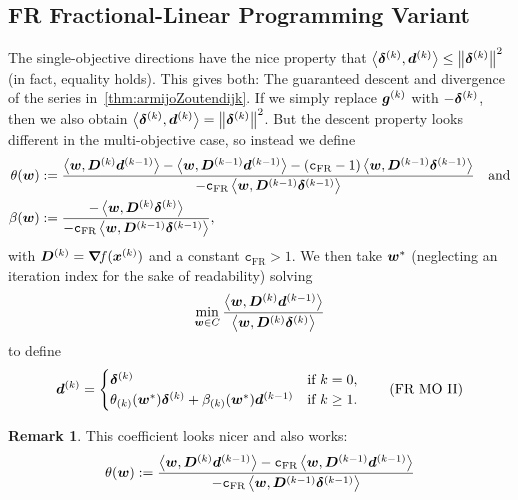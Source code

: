 \documentclass{article}
\theoremstyle{plain}
\theoremstyle{definition}
\newtheorem*{remark*}{Remark}
\begin{document}
\subsection{FR Fractional-Linear Programming Variant}
\newcommand*{\constFR}{\mathtt{c}_{\text{FR}}}
The single-objective directions have the nice property that 
$\left\langle \bm{\delta}^{(k)}, \bm{d}^{(k)} \right\rangle \leq \left\|\bm{\delta}^{(k)}\right\|^2$ (in fact, equality holds).
This gives both: The guaranteed descent and divergence of the series 
in~\cref{thm:armijoZoutendijk}.
If we simply replace $\bm{g}^{(k)}$ with $-\bm{\delta}^{(k)}$, then we also obtain 
$\left\langle \bm{\delta}^{(k)}, \bm{d}^{(k)} \right\rangle = \left\|\bm{\delta}^{(k)}\right\|^2$.
But the descent property looks different in the multi-objective case, 
so instead we define
\begin{align*}
\theta(\ve w)
&:= 
\frac{
	\mul{\ve w}{\ve D\KK \vdKp}
	-
	\mul{\ve w}{\ve D\KKp \vdKp}
	-(\constFR - 1)
	\mul{\ve w}{\ve D\KKp \sdKp}
}{
	-\constFR
	\mul{\ve w}{\ve D\KKp \sdKp}
}
&\text{and}
\\
\beta(\ve w)
&:=
\frac{
	-\mul{\ve w}{\ve D\KK \sdK}
}{
	-\constFR 
	\mul{\ve w}{\ve D\KKp \sdKp}
},
\end{align*}
with $\bm{D}^{(k)} = \bm{\nabla}\!f(\bm{x}^{(k)})$ and a constant $\constFR > 1$.
We then take $\bm{w}^*$
(neglecting an iteration index for the sake of readability) solving
\begin{equation}
\min_{\bm{w}\in C}
\frac{
	\left\langle \bm{w}, \bm{D}^{(k)} \bm{d}^{(k-1)} \right\rangle
}{
	\left\langle \bm{w}, \bm{D}^{(k)} \bm{\delta}^{(k)} \right\rangle
}
\label{eqn:gressingDocile}
\end{equation}
to define
\begin{equation}
	\bm{d}^{(k)} =
	\begin{cases}
		\bm{\delta}^{(k)}
		&\text{if $k=0$},
		\\
		\theta_{(k)}(\bm{w}^*)
			\bm{\delta}^{(k)}
			+
			\beta_{(k)}(\bm{w}^*)
			\bm{d}^{(k-1)}
		&\text{if $k \geq 1$.}
	\end{cases}
	\tag{FR~MO~II}
	\label{eqn:frMO2}
\end{equation}
\begin{remark*}
	This coefficient looks nicer and also works:
	$$
	\theta(\ve w)
		:= 
		\frac{
			\mul{\ve w}{\ve D\KK \vdKp}
			-
			\constFR\mul{\ve w}{\ve D\KKp \vdKp}
		}{
			-\constFR
			\mul{\ve w}{\ve D\KKp \sdKp}
		}
	$$
\end{remark*}
\end{document}
